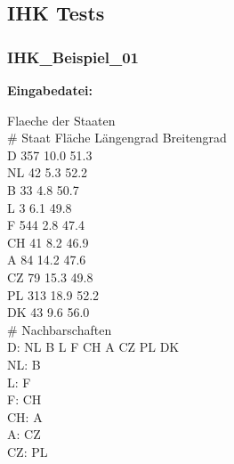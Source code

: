 \documentclass[a4paper,11pt]{article}
\begin{document}
{\subsection{IHK Tests}
\subsubsection{IHK\_Beispiel\_01}
	\textbf{Eingabedatei:}
	\begin{mdframed}[linewidth=0pt, backgroundcolor=background, innertopmargin=10pt, innerbottommargin=10pt]
	Flaeche der Staaten\\
	\# Staat Fläche Längengrad Breitengrad\\
	D 357 10.0 51.3\\
	NL 42 5.3 52.2\\
	B 33 4.8 50.7\\
	L 3 6.1 49.8\\
	F 544 2.8 47.4\\
	CH 41 8.2 46.9\\
	A 84 14.2 47.6\\
	CZ 79 15.3 49.8\\
	PL 313 18.9 52.2\\
	DK 43 9.6 56.0\\
	\# Nachbarschaften\\
	D: NL B L F CH A CZ PL DK\\
	NL: B\\
	L: F\\
	F: CH\\
	CH: A\\
	A: CZ\\
	CZ: PL
	\end{mdframed}

}
\end{document}

